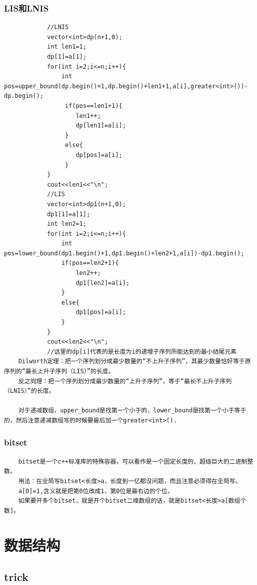 \documentclass[10pt, a4paper, twocolumn]{article} %
\begin{document}
     \subsubsection{LIS和LNIS}
    \begin{lstlisting}
    		//LNIS
			vector<int>dp(n+1,0);	
			int len1=1;
			dp[1]=a[1];
			for(int i=2;i<=n;i++){
				int pos=upper_bound(dp.begin()+1,dp.begin()+len1+1,a[i],greater<int>())-dp.begin();
				 if(pos==len1+1){
					len1++;
					dp[len1]=a[i];
				 }
				 else{
					dp[pos]=a[i];
				 }
			}
			cout<<len1<<"\n";
			//LIS
			vector<int>dp1(n+1,0);
			dp1[1]=a[1];
			int len2=1;
			for(int i=2;i<=n;i++){
				int pos=lower_bound(dp1.begin()+1,dp1.begin()+len2+1,a[i])-dp1.begin();
				if(pos==len2+1){
					len2++;
					dp1[len2]=a[i];
				}
				else{
					dp1[pos]=a[i];
				}
			}
			cout<<len2<<"\n";
            //这里的dp[i]代表的是长度为i的递增子序列所能达到的最小结尾元素
    Dilworth定理：把一个序列划分成最少数量的“不上升子序列”，其最少数量恰好等于原序列的“最长上升子序列（LIS）”的长度。
    反之同理：把一个序列划分成最少数量的“上升子序列”，等于“最长不上升子序列（LNIS）”的长度。

    对于递减数组，upper_bound是找第一个小于的，lower_bound是找第一个小于等于的，然后注意递减数组写的时候要最后加一个greater<int>().
    \end{lstlisting}
    \subsubsection{bitset}
    \begin{lstlisting}
    bitset是一个c++标准库的特殊容器，可以看作是一个固定长度的、超级巨大的二进制整数。
    用法：在全局写bitset<长度>a，长度到一亿都没问题，而且注意必须得在全局写。
    a[0]=1,含义就是把第0位改成1，第0位是最右边的个位。
    如果要开多个bitset，就是开个bitset二维数组的话，就是bitset<长度>a[数组个数]。
    \end{lstlisting}
    \section{数据结构}
    \subsection{trick}
\end{document}
